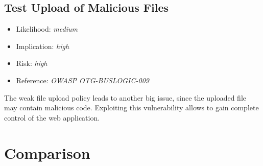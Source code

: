 \subsection{Test Upload of Malicious Files} \label{over:malicious}
\begin{itemize}
	\item Likelihood: \textit{medium}
	\item Implication: \textit{high}
	\item Risk: \textit{high}
	\item Reference: \textit{OWASP OTG-BUSLOGIC-009}
\end{itemize}
The weak file upload policy leads to another big issue, since the uploaded file may contain malicious code. Exploiting this vulnerability allows to gain complete control of the web application.

\section{\gnb}

\section{Comparison}
